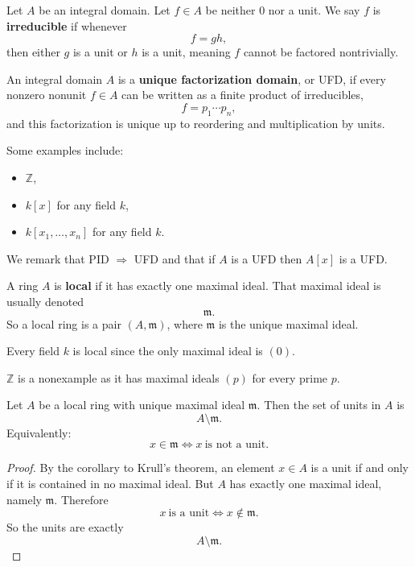 \documentclass[11pt]{article}
\begin{document}
\begin{defn}
    Let $A$ be an integral domain. Let $f \in A$ be neither 
    $0$ nor a unit. We say $f$ is \textbf{irreducible} 
    if whenever 
    \[
        f = gh, 
    \]
    then either $g$ is a unit or $h$ is a unit, 
    meaning $f$ cannot be factored nontrivially. 
\end{defn}
\begin{defn}[UFD]
    An integral domain $A$ is a \textbf{unique factorization domain},
    or UFD, if every nonzero nonunit $f \in A$ can be written as 
    a finite product of irreducibles, 
    \[
        f = p_1 \cdots p_n,
    \]
    and this factorization is unique up to reordering and  
    multiplication by units. 
\end{defn}
\begin{ex}
    Some examples include: 
    \begin{itemize}
        \item $\mathbb Z$, 
        \item $k[x]$ for any field $k$, 
        \item $k[x_1,\ldots,x_n]$ for any field $k$. 
    \end{itemize}
\end{ex}

We remark that PID $\Rightarrow$ UFD and that if 
$A$ is a UFD then $A[x]$ is a UFD. 

\begin{defn}
    A ring $A$ is \textbf{local} if it has exactly 
    one maximal ideal. 
    That maximal ideal is usually denoted 
    \[
        \mathfrak m. 
    \]
    So a local ring is a pair $(A, \mathfrak m)$, 
    where $\mathfrak m$ is the unique maximal ideal. 
\end{defn}

\begin{ex}
    Every field $k$ is local since the only maximal ideal 
    is $(0)$. 

    $\mathbb Z$ is a nonexample as it has maximal ideals 
    $(p)$ for every prime $p$. 
\end{ex}

\begin{prop}
    Let $A$ be a local ring with unique maximal ideal 
    $\mathfrak m$. Then the set of units in $A$ is 
    \[
        A \setminus \mathfrak m. 
    \]
    Equivalently: 
    \[
        x \in \mathfrak m 
        \Leftrightarrow x \ \text{is not a unit}. 
    \]
\end{prop}
\begin{proof}
    By the corollary to Krull's theorem, an element $x \in A$ 
    is a unit if and only if it is contained in no maximal ideal. 
    But $A$ has exactly one maximal ideal, namely 
    $\mathfrak m$. 
    Therefore 
    \[
        x \ \text{is a unit} \Leftrightarrow 
        x \not\in \mathfrak m. 
    \]
    So the units are exactly 
    \[
        A \setminus \mathfrak m. 
    \]
\end{proof}
\end{document}

